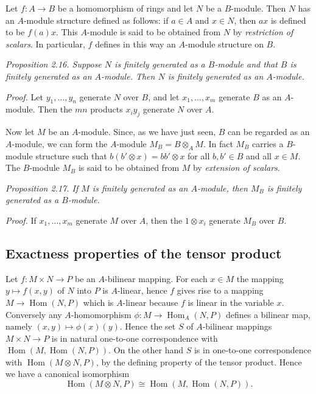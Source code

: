 Let $f:A\longrightarrow B$ be a homomorphism of rings and let $N$ be a $B$-module. Then $N$ has an $A$-module structure defined as follows: if $a\in A$ and $x\in N$, then $ax$ is defined to be $f(a)x$. This $A$-module is said to be obtained from $N$ by \textit{restriction of scalars}. In particular, $f$ defines in this way an $A$-module structure on $B$.

\noindent\textit{Proposition 2.16. Suppose $N$ is finitely generated as a $B$-module and that $B$ is finitely generated as an $A$-module. Then $N$ is finitely generated as an $A$-module.}

\noindent\textit{Proof.} Let $y_1,\ldots,y_n$ generate $N$ over $B$, and let $x_1,\ldots,x_m$ generate $B$ as an $A$-module. Then the $mn$ products $x_i y_j$ generate $N$ over $A$. \proofbox

Now let $M$ be an $A$-module. Since, as we have just seen, $B$ can be regarded as an $A$-module, we can form the $A$-module $M_B=B\otimes_A M$. In fact $M_B$ carries a $B$-module structure such that $b(b'\otimes x)=bb'\otimes x$ for all $b,b'\in B$ and all $x\in M$. The $B$-module $M_B$ is said to be obtained from $M$ by \textit{extension of scalars}.

\noindent\textit{Proposition 2.17. If $M$ is finitely generated as an $A$-module, then $M_B$ is finitely generated as a $B$-module.}

\noindent\textit{Proof.} If $x_1,\ldots,x_m$ generate $M$ over $A$, then the $1\otimes x_i$ generate $M_B$ over $B$. \proofbox

\subsection{Exactness properties of the tensor product}

Let $f:M\times N\longrightarrow P$ be an $A$-bilinear mapping. For each $x\in M$ the mapping $y\mapsto f(x,y)$ of $N$ into $P$ is $A$-linear, hence $f$ gives rise to a mapping $M\longrightarrow\operatorname{Hom}(N,P)$ which is $A$-linear because $f$ is linear in the variable $x$. Conversely any $A$-homomorphism $\phi:M\longrightarrow\operatorname{Hom}_A(N,P)$ defines a bilinear map, namely $(x,y)\mapsto\phi(x)(y)$. Hence the set $S$ of $A$-bilinear mappings $M\times N\longrightarrow P$ is in natural one-to-one correspondence with $\operatorname{Hom}(M,\operatorname{Hom}(N,P))$. On the other hand $S$ is in one-to-one correspondence with $\operatorname{Hom}(M\otimes N,P)$, by the defining property of the tensor product. Hence we have a canonical isomorphism
\begin{equation}
 \operatorname{Hom}(M\otimes N,P)\cong\operatorname{Hom}(M,\operatorname{Hom}(N,P)).
 \tag{1}
\end{equation}

